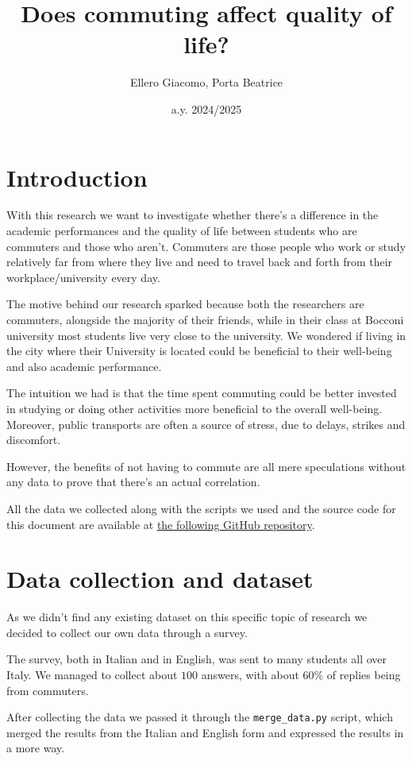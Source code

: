 \documentclass[11pt]{extarticle}
\title{Does commuting affect quality of life?}
\author{Ellero Giacomo, Porta Beatrice}
\date{a.y. 2024/2025}
\numberwithin{table}{section}
\numberwithin{figure}{section}
\numberwithin{equation}{section}
\begin{document}
\maketitle

\section{Introduction}

With this research we want to investigate whether there’s a difference in the academic performances
and the quality of life between students who are commuters and those who aren't.
Commuters are those people who work or study relatively far from where they live
and need to travel back and forth from their workplace/university every day.

The motive behind our research sparked because both the researchers are commuters,
alongside the majority of their friends, while in their class at Bocconi university most students
live very close to the university.
We wondered if living in the city where their University is located could be beneficial
to their well-being and also academic performance.

The intuition we had is that the time spent commuting could be better invested in studying
or doing other activities more beneficial to the overall well-being.
Moreover, public transports are often a source of stress, due to delays, strikes and discomfort.

However, the benefits of not having to commute are all mere speculations without any data to prove
that there’s an actual correlation.

All the data we collected along with the scripts we used and the source code for this document
are available at
\href{https://github.com/billy4479/stats-research-project}{the following GitHub repository}.

\section{Data collection and dataset}

As we didn't find any existing dataset on this specific topic of research we decided
to collect our own data through a survey.

The survey, both in Italian and in English, was sent to many students all over Italy.
We managed to collect about $100$ answers, with about $60\%$ of replies being from commuters.

After collecting the data we passed it through the \texttt{merge\_data.py} script,
which merged the results from the Italian and English form and expressed the results in a more
 way.
\end{document}
